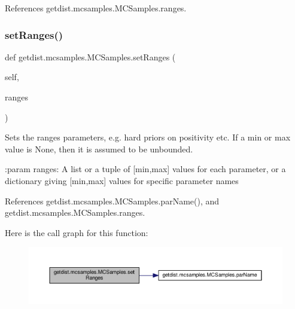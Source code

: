 References getdist.\+mcsamples.\+M\+C\+Samples.\+ranges.

\mbox{\label{classgetdist_1_1mcsamples_1_1MCSamples_aa8eab52322d3b2e920bcc24a223c5514}} 
\subsubsection{\texorpdfstring{set\+Ranges()}{setRanges()}}
{\footnotesize\ttfamily def getdist.\+mcsamples.\+M\+C\+Samples.\+set\+Ranges (\begin{DoxyParamCaption}\item[{}]{self,  }\item[{}]{ranges }\end{DoxyParamCaption})}

\begin{DoxyVerb}Sets the ranges parameters, e.g. hard priors on positivity etc. If a min or max value is None, then it is assumed to be unbounded.

:param ranges: A list or a tuple of [min,max] values for each parameter, 
       or a dictionary giving [min,max] values for specific parameter names
\end{DoxyVerb}
 

References getdist.\+mcsamples.\+M\+C\+Samples.\+par\+Name(), and getdist.\+mcsamples.\+M\+C\+Samples.\+ranges.

Here is the call graph for this function\+:
\nopagebreak
\begin{figure}[H]
\begin{center}
\leavevmode
\includegraphics[width=350pt]{classgetdist_1_1mcsamples_1_1MCSamples_aa8eab52322d3b2e920bcc24a223c5514_cgraph}
\end{center}
\end{figure}
\mbox{\label{classgetdist_1_1mcsamples_1_1MCSamples_aff509a0c9efdb8ea56bc44cf7d11c328}} 
